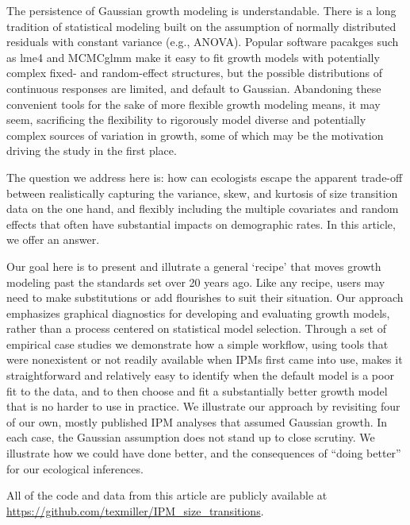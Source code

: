 \documentclass[12pt]{article}
\begin{document}
The persistence of Gaussian growth modeling is understandable. 
There is a long tradition of statistical modeling built on the assumption of normally distributed residuals with constant variance (e.g., ANOVA).
Popular software pacakges such as lme4 \citep{bates2007lme4} and MCMCglmm \citep{hadfield2010mcmc} make it easy to fit growth models with potentially complex fixed- and random-effect structures, but the possible distributions of continuous responses are limited, and default to Gaussian.
Abandoning these convenient tools for the sake of more flexible growth modeling means, it may seem, sacrificing the flexibility to rigorously model diverse and potentially complex sources of variation in growth, some of which may be the motivation driving the study in the first place.

The question we address here is: how can ecologists escape the apparent trade-off between realistically capturing the 
variance, skew, and kurtosis of size transition data on the one hand, and flexibly including the multiple covariates and random effects 
that often have substantial impacts on demographic rates.  
In this article, we offer an answer. 

Our goal here is to present and illutrate a general `recipe' that moves growth modeling past the standards set over 20 years ago.
Like any recipe, users may need to make substitutions or add flourishes to suit their situation. 
Our approach emphasizes graphical diagnostics for developing and evaluating growth models, rather than a process 
centered on statistical model selection. 
Through a set of empirical case studies we demonstrate how a simple workflow, using tools 
that were nonexistent or not readily available when IPMs first came into use, makes it straightforward and relatively 
easy to identify when the default model is a poor fit to the data, and to then choose and fit a substantially 
better growth model that is no harder to use in practice. 
We illustrate our approach by revisiting four of our own, mostly published IPM analyses that assumed Gaussian growth. 
In each case, the Gaussian assumption does not stand up to close scrutiny. 
We illustrate how we could have done better, and the consequences of ``doing better'' 
for our ecological inferences. 

All of the code and data from this article are publicly available at \url{https://github.com/texmiller/IPM_size_transitions}.
\end{document}
